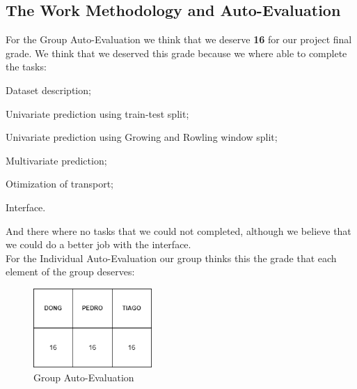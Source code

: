 \newpage

\subsection{The Work Methodology and Auto-Evaluation}
\quad For the Group Auto-Evaluation we think that we deserve {\bfseries 16} for our project final grade. We think that we deserved this grade because we where able to complete the tasks:

\quad \textbullet Dataset description;

\quad \textbullet Univariate prediction using train-test split;

\quad \textbullet Univariate prediction using Growing and Rowling window split;

\quad \textbullet Multivariate prediction;

\quad \textbullet Otimization of transport;

\quad \textbullet Interface.

And there where no tasks that we could not completed, although we believe that we could do a better job with the interface.\\

For the Individual Auto-Evaluation our group thinks this the grade that each element of the group deserves:
\\
\begin{figure}[H]
    \centering
    \includegraphics[width=0.4\textwidth]{assets/notas.png}
    \caption{Group Auto-Evaluation}
    \label{fig:notas}
    \end{figure}